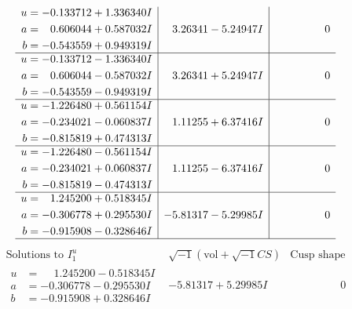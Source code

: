 \documentclass[1p]{elsarticle_modified}
\theoremstyle{definition}
\newcommand{\I}{\sqrt{-1}}
\begin{document}
$$\begin{array}{c|c|c}
\begin{aligned}
u &= -0.133712 + 1.336340 I \\
a &= \phantom{-}0.606044 + 0.587032 I \\
b &= -0.543559 + 0.949319 I\end{aligned}
 & \phantom{-}3.26341 - 5.24947 I & \phantom{-0.000000 } 0 \\ \hline\begin{aligned}
u &= -0.133712 - 1.336340 I \\
a &= \phantom{-}0.606044 - 0.587032 I \\
b &= -0.543559 - 0.949319 I\end{aligned}
 & \phantom{-}3.26341 + 5.24947 I & \phantom{-0.000000 } 0 \\ \hline\begin{aligned}
u &= -1.226480 + 0.561154 I \\
a &= -0.234021 - 0.060837 I \\
b &= -0.815819 + 0.474313 I\end{aligned}
 & \phantom{-}1.11255 + 6.37416 I & \phantom{-0.000000 } 0 \\ \hline\begin{aligned}
u &= -1.226480 - 0.561154 I \\
a &= -0.234021 + 0.060837 I \\
b &= -0.815819 - 0.474313 I\end{aligned}
 & \phantom{-}1.11255 - 6.37416 I & \phantom{-0.000000 } 0 \\ \hline\begin{aligned}
u &= \phantom{-}1.245200 + 0.518345 I \\
a &= -0.306778 + 0.295530 I \\
b &= -0.915908 - 0.328646 I\end{aligned}
 & -5.81317 - 5.29985 I & \phantom{-0.000000 } 0\\
 \hline 
 \end{array}$$\newpage$$\begin{array}{c|c|c}  
\text{Solutions to }I^u_{1}& \I (\text{vol} + \sqrt{-1}CS) & \text{Cusp shape}\\
 \hline 
\begin{aligned}
u &= \phantom{-}1.245200 - 0.518345 I \\
a &= -0.306778 - 0.295530 I \\
b &= -0.915908 + 0.328646 I\end{aligned}
 & -5.81317 + 5.29985 I & \phantom{-0.000000 } 0 \\ \hline\begin{aligned}

\end{aligned}
\end{array}$$
\end{document}
